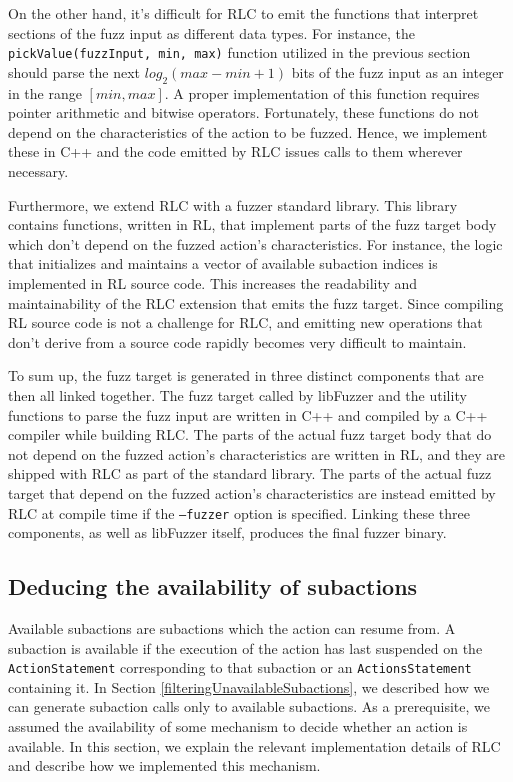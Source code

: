 On the other hand, it's difficult for RLC to emit the functions that interpret sections of the fuzz input as different data types.
For instance, the \texttt{pickValue(fuzzInput, min, max)} function utilized in the previous section should parse the next $log_2(max - min + 1)$ bits of 
    the fuzz input as an integer in the range $[min, max]$.
A proper implementation of this function requires pointer arithmetic and bitwise operators.
Fortunately, these functions do not depend on the characteristics of the action to be fuzzed.
Hence, we implement these in C++ and the code emitted by RLC issues calls to them wherever necessary.

Furthermore, we extend RLC with a fuzzer standard library.
This library contains functions, written in RL, that implement parts of the fuzz target body which don't depend on the fuzzed action's characteristics.
For instance, the logic that initializes and maintains a vector of available subaction indices is implemented in RL source code.
This increases the readability and maintainability of the RLC extension that emits the fuzz target.
Since compiling RL source code is not a challenge for RLC, and emitting new operations that don't derive from a source code rapidly becomes very difficult to maintain.

To sum up, the fuzz target is generated in three distinct components that are then all linked together.
The fuzz target called by libFuzzer and the utility functions to parse the fuzz input are written in C++ and compiled by a C++ compiler while building RLC.
The parts of the actual fuzz target body that do not depend on the fuzzed action's characteristics are written in RL, and they are shipped with RLC as part of the standard library.
The parts of the actual fuzz target that depend on the fuzzed action's characteristics are instead emitted by RLC at compile time if the \texttt{--fuzzer} option is specified.
Linking these three components, as well as libFuzzer itself, produces the final fuzzer binary.

\subsection{Deducing the availability of subactions}
Available subactions are subactions which the action can resume from. A subaction is available if the execution of the action has last suspended on the \texttt{ActionStatement} corresponding to that subaction or an \texttt{ActionsStatement} containing it.
In Section \ref{filteringUnavailableSubactions}, we described how we can generate subaction calls only to available subactions.
As a prerequisite, we assumed the availability of some mechanism to decide whether an action is available.
In this section, we explain the relevant implementation details of RLC and describe how we implemented this mechanism.

